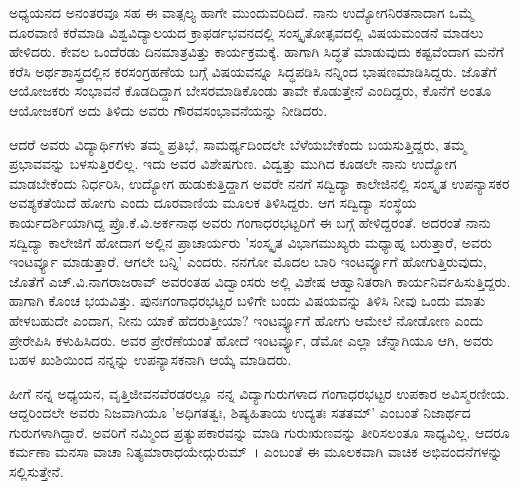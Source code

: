 {ಅಧ್ಯಯನದ ಅನಂತರವೂ ಸಹ ಈ ವಾತ್ಸಲ್ಯ ಹಾಗೇ ಮುಂದುವರಿದಿದೆ. ನಾನು ಉದ್ಯೋಗನಿರತನಾದಾಗ ಒಮ್ಮೆ ದೂರವಾಣಿ ಕರೆಮಾಡಿ ವಿಶ್ವವಿದ್ಯಾಲಯದ ಕ್ರಾಫರ್ಡಭವನದಲ್ಲಿ ಸಂಸ್ಕೃತೋತ್ಸವದಲ್ಲಿ ವಿಷಯಮಂಡನೆ ಮಾಡಲು ಹೇಳಿದರು. ಕೇವಲ ಒಂದೆರಡು ದಿನಮಾತ್ರವಿತ್ತು ಕಾರ್ಯಕ್ರಮಕ್ಕೆ. ಹಾಗಾಗಿ ಸಿದ್ಧತೆ ಮಾಡುವುದು ಕಷ್ಟವೆಂದಾಗ ಮನೆಗೆ ಕರೆಸಿ ಅರ್ಥಶಾಸ್ತ್ರದಲ್ಲಿನ ಕರಸಂಗ್ರಹಣೆಯ ಬಗ್ಗೆ ವಿಷಯವನ್ನೂ ಸಿದ್ಧಪಡಿಸಿ ನನ್ನಿಂದ ಭಾಷಣಮಾಡಿಸಿದ್ದರು. ಜೊತೆಗೆ ಆಯೋಜಕರು ಸಂಭಾವನೆ ಕೊಡದಿದ್ದಾಗ ಬೇಸರಮಾಡಿಕೊಂಡು ತಾವೇ ಕೊಡುತ್ತೇನೆ ಎಂದಿದ್ದರು, ಕೊನೆಗೆ ಅಂತೂ ಆಯೋಜಕರಿಗೆ ಅದು ತಿಳಿದು ಅವರು ಗೌರವಸಂಭಾವನೆಯನ್ನು ನೀಡಿದರು.

ಆದರೆ ಅವರು ವಿದ್ಯಾರ್ಥಿಗಳು ತಮ್ಮ ಪ್ರತಿಭೆ, ಸಾಮರ್ಥ್ಯದಿಂದಲೇ ಬೆಳೆಯಬೇಕೆಂದು ಬಯಸುತ್ತಿದ್ದರು, ತಮ್ಮ ಪ್ರಭಾವವನ್ನು ಬಳಸುತ್ತಿರಲಿಲ್ಲ. ಇದು ಅವರ ವಿಶೇಷಗುಣ. ವಿದ್ವತ್ತು ಮುಗಿದ ಕೂಡಲೇ ನಾನು ಉದ್ಯೋಗ ಮಾಡಬೇಕೆಂದು ನಿರ್ಧರಿಸಿ, ಉದ್ಯೋಗ ಹುಡುಕುತ್ತಿದ್ದಾಗ ಅವರೇ ನನಗೆ ಸದ್ವಿದ್ಯಾ ಕಾಲೇಜಿನಲ್ಲಿ ಸಂಸ್ಕೃತ ಉಪನ್ಯಾಸಕರ ಅವಶ್ಯಕತೆಯಿದೆ ಹೋಗು ಎಂದು ದೂರವಾಣಿಯ ಮೂಲಕ ತಿಳಿಸಿದ್ದರು. ಆಗ ಸದ್ವಿದ್ಯಾ ಸಂಸ್ಥೆಯ ಕಾರ್ಯದರ್ಶಿಯಾಗಿದ್ದ ಪ್ರೊ.ಕೆ.ವಿ.ಅರ್ಕನಾಥ ಅವರು ಗಂಗಾಧರಭಟ್ಟರಿಗೆ ಈ ಬಗ್ಗೆ ಹೇಳಿದ್ದರಂತೆ. ಅದರಂತೆ ನಾನು ಸದ್ವಿದ್ಯಾ ಕಾಲೇಜಿಗೆ ಹೋದಾಗ ಅಲ್ಲಿನ ಪ್ರಾಚಾರ್ಯರು ’ಸಂಸ್ಕೃತ ವಿಭಾಗಮುಖ್ಯರು ಮಧ್ಯಾಹ್ನ ಬರುತ್ತಾರೆ, ಅವರು ಇಂಟರ್ವ್ಯೂ ಮಾಡುತ್ತಾರೆ. ಆಗಲೇ ಬನ್ನಿ’ ಎಂದರು. ನನಗೋ ಮೊದಲ ಬಾರಿ ಇಂಟರ್ವ್ಯೂಗೆ ಹೋಗುತ್ತಿರುವುದು, ಜೊತೆಗೆ ಎಚ್.ವಿ.ನಾಗರಾಜರಾವ್ ಅವರಂತಹ ವಿದ್ವಾಂಸರು ಅಲ್ಲಿ ವಿಶೇಷ ಆಹ್ವಾನಿತರಾಗಿ ಕಾರ್ಯನಿರ್ವಹಿಸುತ್ತಿದ್ದರು. ಹಾಗಾಗಿ ಕೊಂಚ ಭಯವಿತ್ತು. ಪುನಃಗಂಗಾಧರಭಟ್ಟರ ಬಳಿಗೇ ಬಂದು ವಿಷಯವನ್ನು ತಿಳಿಸಿ ನೀವು ಒಂದು ಮಾತು ಹೇಳಬಹುದೇ ಎಂದಾಗ, ನೀನು ಯಾಕೆ ಹೆದರುತ್ತೀಯಾ? ಇಂಟರ್ವ್ಯೂಗೆ ಹೋಗು ಆಮೇಲೆ ನೋಡೋಣ ಎಂದು ಪ್ರೇರೇಪಿಸಿ ಕಳುಹಿಸಿದರು. ಅವರ ಪ್ರೇರೆಣೆಯಂತೆ ಹೋದೆ ಇಂಟರ್ವ್ಯೂ, ಡೆಮೋ ಎಲ್ಲಾ ಚೆನ್ನಾಗಿಯೂ ಆಗಿ, ಅವರು ಬಹಳ ಖುಶಿಯಿಂದ ನನ್ನನ್ನು ಉಪನ್ಯಾಸಕನಾಗಿ ಆಯ್ಕೆ ಮಾಡಿದರು.

ಹೀಗೆ ನನ್ನ ಅಧ್ಯಯನ, ವೃತ್ತಿಜೀವನವೆರಡರಲ್ಲೂ ನನ್ನ ವಿದ್ಯಾಗುರುಗಳಾದ ಗಂಗಾಧರಭಟ್ಟರ ಉಪಕಾರ ಅವಿಸ್ಮರಣೀಯ. ಆದ್ದರಿಂದಲೇ ಅವರು ನಿಜವಾಗಿಯೂ ’ಅಧಿಗತತ್ವಃ, ಶಿಷ್ಯಹಿತಾಯ ಉದ್ಯತಃ ಸತತಮ್’ ಎಂಬಂತೆ ನಿಜಾರ್ಥದ ಗುರುಗಳಾಗಿದ್ದಾರೆ. ಅವರಿಗೆ ನಮ್ಮಿಂದ ಪ್ರತ್ಯುಪಕಾರವನ್ನು ಮಾಡಿ ಗುರುಋಣವನ್ನು ತೀರಿಸಲಂತೂ ಸಾಧ್ಯವಿಲ್ಲ. ಆದರೂ ಕರ್ಮಣಾ ಮನಸಾ ವಾಚಾ ನಿತ್ಯಮಾರಾಧಯೇದ್ಗುರುಮ್~। ಎಂಬಂತೆ ಈ ಮೂಲಕವಾಗಿ ವಾಚಿಕ ಅಭಿವಂದನೆಗಳನ್ನು ಸಲ್ಲಿಸುತ್ತೇನೆ.

\articleend
}
